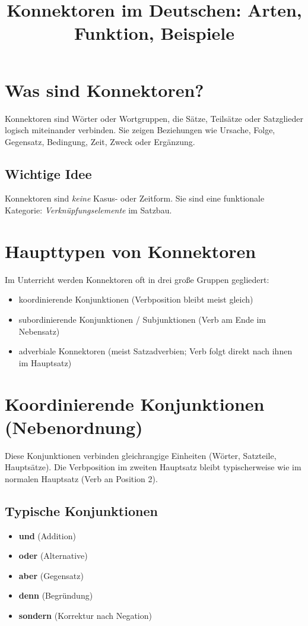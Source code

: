 \documentclass[a4paper,12pt]{article}
\title{Konnektoren im Deutschen: Arten, Funktion, Beispiele}
\date{}
\begin{document}
    \maketitle
    
    
    \section{Was sind Konnektoren?}
        Konnektoren sind W\"orter oder Wortgruppen, die S\"atze, Teils\"atze oder Satzglieder logisch miteinander verbinden.
        Sie zeigen Beziehungen wie Ursache, Folge, Gegensatz, Bedingung, Zeit, Zweck oder Ergänzung.
        
        \subsection{Wichtige Idee}
            Konnektoren sind \emph{keine} Kasus- oder Zeitform.
            Sie sind eine funktionale Kategorie: \emph{Verkn\"upfungselemente} im Satzbau.
    
    
    \section{Haupttypen von Konnektoren}
        Im Unterricht werden Konnektoren oft in drei große Gruppen gegliedert:
        \begin{itemize}[leftmargin=2em]
			\item koordinierende Konjunktionen (Verbposition bleibt meist gleich)
            \item subordinierende Konjunktionen / Subjunktionen (Verb am Ende im Nebensatz)
            \item adverbiale Konnektoren (meist Satzadverbien; Verb folgt direkt nach ihnen im Hauptsatz)
        \end{itemize}
    
    
    \section{Koordinierende Konjunktionen (Nebenordnung)}
        Diese Konjunktionen verbinden gleichrangige Einheiten (W\"orter, Satzteile, Haupts\"atze).
        Die Verbposition im zweiten Hauptsatz bleibt typischerweise wie im normalen Hauptsatz (Verb an Position 2).
        
        \subsection{Typische Konjunktionen}
            \begin{itemize}[leftmargin=2em]
				\item \textbf{und} (Addition)
                \item \textbf{oder} (Alternative)
                \item \textbf{aber} (Gegensatz)
                \item \textbf{denn} (Begründung)
                \item \textbf{sondern} (Korrektur nach Negation)
            \end{itemize}
        
\end{document}
